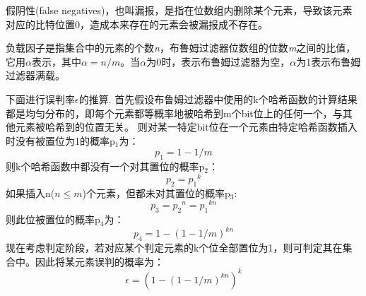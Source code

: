 \begin{definition}
	假阴性(false negatives)，也叫漏报，是指在位数组内删除某个元素，导致该元素对应的比特位置0，造成本来存在的元素会被漏报成不存在。
\end{definition}

\begin{definition}
	负载因子是指集合中的元素的个数\textit{n}，布鲁姆过滤器位数组的位数\textit{m}之间的比值，它用\begin{math} \alpha \end{math}表示，其中\begin{math} \alpha  = {n/m} \end{math}。当\begin{math} \alpha \end{math}为0时，表示布鲁姆过滤器为空，\begin{math} \alpha \end{math}为1表示布鲁姆过滤器满载。
\end{definition}

下面进行误判率\begin{math}\epsilon\end{math}的推算.
首先假设布鲁姆过滤器中使用的k个哈希函数的计算结果都是均匀分布的，即每个元素都等概率地被哈希到m个bit位上的任何一个，与其他元素被哈希到的位置无关。
则对某一特定bit位在一个元素由特定哈希函数插入时没有被置位为1的概率p$_1$为：
\begin{equation}
p_1 = 1-{1/m}
\end{equation}
则k个哈希函数中都没有一个对其置位的概率p$_2$：
\begin{equation}
p_2 = {p_1}^k
\end{equation}
如果插入n(\begin{math}n\leqslant m\end{math})个元素，但都未对其置位的概率p$_3$:
\begin{equation}
p_3 = {p_2}^n = {p_1}^{kn}
\end{equation}
则此位被置位的概率p$_4$为：
\begin{equation}
p_4 = 1 - \left(1 - {1/m}\right)^{kn}
\label{equ:alpha}
\end{equation}
现在考虑判定阶段，若对应某个判定元素的k个位全部置位为1，则可判定其在集合中。因此将某元素误判的概率为：
\begin{equation}
\epsilon = \left(1 - \left(1 - {1/m}\right)^{kn}\right)^k
\label{equ:epsilon}
\end{equation}


